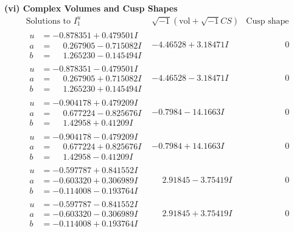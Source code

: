 \documentclass[1p]{elsarticle_modified}
\theoremstyle{definition}
\newcommand{\I}{\sqrt{-1}}
\begin{document}
\newpage\flushleft \textbf{(vi) Complex Volumes and Cusp Shapes}
$$\begin{array}{c|c|c}  
\text{Solutions to }I^u_{1}& \I (\text{vol} + \sqrt{-1}CS) & \text{Cusp shape}\\
 \hline 
\begin{aligned}
u &= -0.878351 + 0.479501 I \\
a &= \phantom{-}0.267905 - 0.715082 I \\
b &= \phantom{-}1.265230 - 0.145494 I\end{aligned}
 & -4.46528 + 3.18471 I & \phantom{-0.000000 } 0 \\ \hline\begin{aligned}
u &= -0.878351 - 0.479501 I \\
a &= \phantom{-}0.267905 + 0.715082 I \\
b &= \phantom{-}1.265230 + 0.145494 I\end{aligned}
 & -4.46528 - 3.18471 I & \phantom{-0.000000 } 0 \\ \hline\begin{aligned}
u &= -0.904178 + 0.479209 I \\
a &= \phantom{-}0.677224 - 0.825676 I \\
b &= \phantom{-}1.42958 + 0.41209 I\end{aligned}
 & -0.7984 - 14.1663 I & \phantom{-0.000000 } 0 \\ \hline\begin{aligned}
u &= -0.904178 - 0.479209 I \\
a &= \phantom{-}0.677224 + 0.825676 I \\
b &= \phantom{-}1.42958 - 0.41209 I\end{aligned}
 & -0.7984 + 14.1663 I & \phantom{-0.000000 } 0 \\ \hline\begin{aligned}
u &= -0.597787 + 0.841552 I \\
a &= -0.603320 + 0.306989 I \\
b &= -0.114008 - 0.193764 I\end{aligned}
 & \phantom{-}2.91845 - 3.75419 I & \phantom{-0.000000 } 0 \\ \hline\begin{aligned}
u &= -0.597787 - 0.841552 I \\
a &= -0.603320 - 0.306989 I \\
b &= -0.114008 + 0.193764 I\end{aligned}
 & \phantom{-}2.91845 + 3.75419 I & \phantom{-0.000000 } 0 \\ \hline\begin{aligned}

\end{aligned}
\end{array}$$
\end{document}
